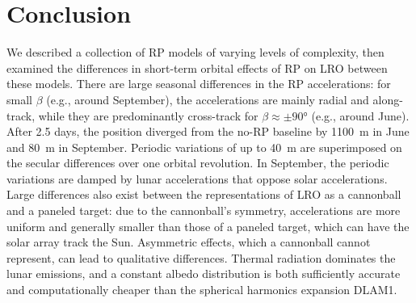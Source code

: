 \section{Conclusion}

We described a collection of \gls{RP} models of varying levels of complexity, then examined the differences in short-term orbital effects of \gls{RP} on \gls{LRO} between these models. There are large seasonal differences in the \gls{RP} accelerations: for small $\beta$ (e.g., around September), the accelerations are mainly radial and along-track, while they are predominantly cross-track for $\beta \approx \pm \ang{90}$ (e.g., around June). After 2.5 days, the position diverged from the no-\gls{RP} baseline by \qty{1100}{\m} in June and \qty{80}{\m} in September. Periodic variations of up to \qty{40}{\m} are superimposed on the secular differences over one orbital revolution. In September, the periodic variations are damped by lunar accelerations that oppose solar accelerations. Large differences also exist between the representations of \gls{LRO} as a cannonball and a paneled target: due to the cannonball's symmetry, accelerations are more uniform and generally smaller than those of a paneled target, which can have the solar array track the Sun. Asymmetric effects, which a cannonball cannot represent, can lead to qualitative differences. Thermal radiation dominates the lunar emissions, and a constant albedo distribution is both sufficiently accurate and computationally cheaper than the spherical harmonics expansion \gls{DLAM1}.

